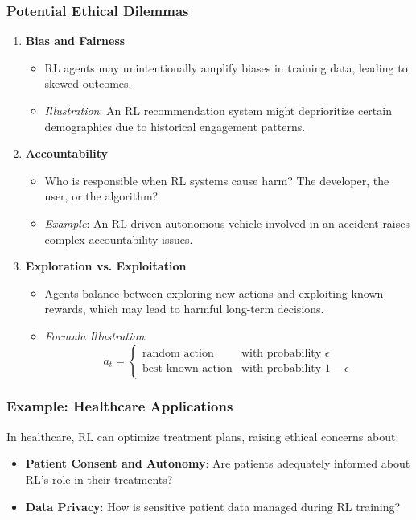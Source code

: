\documentclass[aspectratio=169]{beamer}
\begin{document}
\begin{frame}[fragile]
    \frametitle{Potential Ethical Dilemmas}
    \begin{enumerate}
        \item \textbf{Bias and Fairness}
        \begin{itemize}
            \item RL agents may unintentionally amplify biases in training data, leading to skewed outcomes.
            \item \textit{Illustration}: An RL recommendation system might deprioritize certain demographics due to historical engagement patterns.
        \end{itemize}

        \item \textbf{Accountability}
        \begin{itemize}
            \item Who is responsible when RL systems cause harm? The developer, the user, or the algorithm?
            \item \textit{Example}: An RL-driven autonomous vehicle involved in an accident raises complex accountability issues.
        \end{itemize}

        \item \textbf{Exploration vs. Exploitation}
        \begin{itemize}
            \item Agents balance between exploring new actions and exploiting known rewards, which may lead to harmful long-term decisions.
            \item \textit{Formula Illustration}:
            \begin{equation}
            a_t =
            \begin{cases}
                \text{random action} & \text{with probability } \epsilon \\
                \text{best-known action} & \text{with probability } 1 - \epsilon
            \end{cases}
            \end{equation}
        \end{itemize}
    \end{enumerate}
\end{frame}

\begin{frame}[fragile]
    \frametitle{Example: Healthcare Applications}
    In healthcare, RL can optimize treatment plans, raising ethical concerns about:
    \begin{itemize}
        \item \textbf{Patient Consent and Autonomy}: Are patients adequately informed about RL's role in their treatments?
        \item \textbf{Data Privacy}: How is sensitive patient data managed during RL training?
    \end{itemize}
\end{frame}
\end{document}
